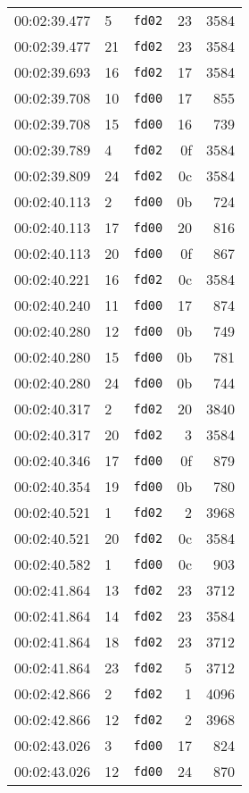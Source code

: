 \documentclass{article}
\begin{document}
\begin{longtable}{lllrr}
00:02:39.477 & 5 & \texttt{fd02} & 23 & 3584 \\
00:02:39.477 & 21 & \texttt{fd02} & 23 & 3584 \\
00:02:39.693 & 16 & \texttt{fd02} & 17 & 3584 \\
00:02:39.708 & 10 & \texttt{fd00} & 17 & 855 \\
00:02:39.708 & 15 & \texttt{fd00} & 16 & 739 \\
00:02:39.789 & 4 & \texttt{fd02} & 0f & 3584 \\
00:02:39.809 & 24 & \texttt{fd02} & 0c & 3584 \\
00:02:40.113 & 2 & \texttt{fd00} & 0b & 724 \\
00:02:40.113 & 17 & \texttt{fd00} & 20 & 816 \\
00:02:40.113 & 20 & \texttt{fd00} & 0f & 867 \\
00:02:40.221 & 16 & \texttt{fd02} & 0c & 3584 \\
00:02:40.240 & 11 & \texttt{fd00} & 17 & 874 \\
00:02:40.280 & 12 & \texttt{fd00} & 0b & 749 \\
00:02:40.280 & 15 & \texttt{fd00} & 0b & 781 \\
00:02:40.280 & 24 & \texttt{fd00} & 0b & 744 \\
00:02:40.317 & 2 & \texttt{fd02} & 20 & 3840 \\
00:02:40.317 & 20 & \texttt{fd02} & 3 & 3584 \\
00:02:40.346 & 17 & \texttt{fd00} & 0f & 879 \\
00:02:40.354 & 19 & \texttt{fd00} & 0b & 780 \\
00:02:40.521 & 1 & \texttt{fd02} & 2 & 3968 \\
00:02:40.521 & 20 & \texttt{fd02} & 0c & 3584 \\
00:02:40.582 & 1 & \texttt{fd00} & 0c & 903 \\
00:02:41.864 & 13 & \texttt{fd02} & 23 & 3712 \\
00:02:41.864 & 14 & \texttt{fd02} & 23 & 3584 \\
00:02:41.864 & 18 & \texttt{fd02} & 23 & 3712 \\
00:02:41.864 & 23 & \texttt{fd02} & 5 & 3712 \\
00:02:42.866 & 2 & \texttt{fd02} & 1 & 4096 \\
00:02:42.866 & 12 & \texttt{fd02} & 2 & 3968 \\
00:02:43.026 & 3 & \texttt{fd00} & 17 & 824 \\
00:02:43.026 & 12 & \texttt{fd00} & 24 & 870 \\

\end{longtable}
\end{document}
